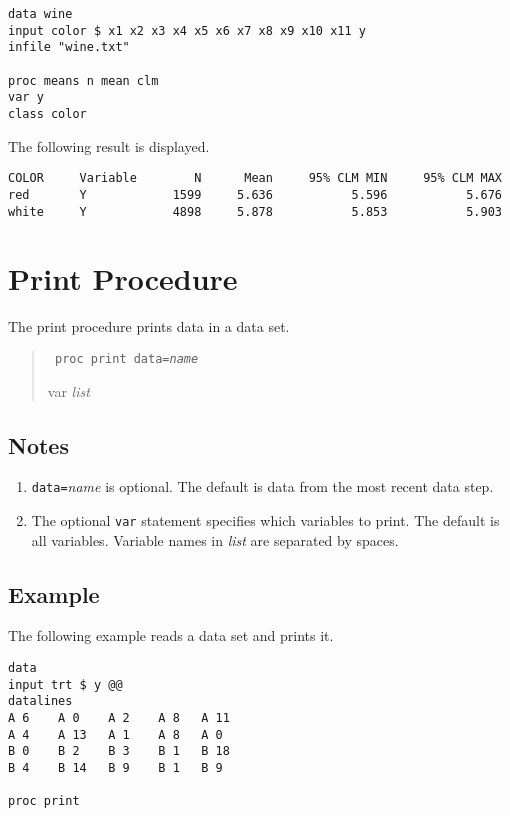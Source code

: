 \documentclass[11pt]{article}
\begin{document}
\begin{Verbatim}
data wine
input color $ x1 x2 x3 x4 x5 x6 x7 x8 x9 x10 x11 y
infile "wine.txt"

proc means n mean clm
var y
class color
\end{Verbatim}

The following result is displayed.

\begin{Verbatim}
COLOR     Variable        N      Mean     95% CLM MIN     95% CLM MAX
red       Y            1599     5.636           5.596           5.676
white     Y            4898     5.878           5.853           5.903
\end{Verbatim}

\newpage

\section{Print Procedure}
The print procedure prints data in a data set.

\begin{quote}
{\tt
proc print data={\it name}

var {\it list}
}
\end{quote}

\subsection*{Notes}
\begin{enumerate}
\item
{\tt data=}{\it name} is optional.
The default is data from the most recent data step.
\item
The optional {\tt var} statement specifies which variables
to print.
The default is all variables.
Variable names in {\it list} are separated by spaces.
\end{enumerate}

\subsection*{Example}
The following example reads a data set
and prints it.

\begin{Verbatim}
data
input trt $ y @@
datalines
A 6    A 0    A 2    A 8   A 11
A 4    A 13   A 1    A 8   A 0
B 0    B 2    B 3    B 1   B 18
B 4    B 14   B 9    B 1   B 9

proc print
\end{Verbatim}
\end{document}
